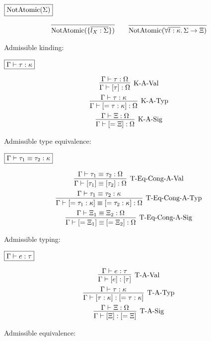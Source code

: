 $\fbox{$\mathop{\mathrm{NotAtomic}}(\Sigma)$}$

\begin{gather*}
  \infer{\symNotAtomic(\{\overline{l_X: \Sigma}\})}{}
  \hspace{2em}
  \infer{\symNotAtomic(\forall \overline{t: \kappa}\ldotp \Sigma \to \Xi)}{}
\end{gather*}

Admissible kinding:

$\fbox{$\Gamma \vdash \tau: \kappa$}$

\begin{gather*}
  \infer[\text{K-A-Val}]{\Gamma \vdash [\tau]: \Omega}{
    \Gamma \vdash \tau: \Omega
  }
  \\
  \infer[\text{K-A-Typ}]{\Gamma \vdash [= \tau: \kappa]: \Omega}{
    \Gamma \vdash \tau: \kappa
  }
  \\
  \infer[\text{K-A-Sig}]{\Gamma \vdash [= \Xi]: \Omega}{
    \Gamma \vdash \Xi: \Omega
  }
\end{gather*}

Admissible type equivalence:

$\fbox{$\Gamma \vdash \tau_1 \equiv \tau_2: \kappa$}$

\begin{gather*}
  \infer[\text{T-Eq-Cong-A-Val}]{\Gamma \vdash [\tau_1] \equiv [\tau_2]: \Omega}{
    \Gamma \vdash \tau_1 \equiv \tau_2: \Omega
  }
  \\
  \infer[\text{T-Eq-Cong-A-Typ}]{\Gamma \vdash [= \tau_1: \kappa] \equiv [= \tau_2: \kappa]: \Omega}{
    \Gamma \vdash \tau_1 \equiv \tau_2: \kappa
  }
  \\
  \infer[\text{T-Eq-Cong-A-Sig}]{\Gamma \vdash [= \Xi_1] \equiv [= \Xi_2]: \Omega}{
    \Gamma \vdash \Xi_1 \equiv \Xi_2: \Omega
  }
\end{gather*}

Admissible typing:

$\fbox{$\Gamma \vdash e: \tau$}$

\begin{gather*}
  \infer[\text{T-A-Val}]{\Gamma \vdash [e]: [\tau]}{
    \Gamma \vdash e: \tau
  }
  \\
  \infer[\text{T-A-Typ}]{\Gamma \vdash [\tau: \kappa]: [= \tau: \kappa]}{
    \Gamma \vdash \tau: \kappa
  }
  \\
  \infer[\text{T-A-Sig}]{\Gamma \vdash [\Xi]: [= \Xi]}{
    \Gamma \vdash \Xi: \Omega
  }
\end{gather*}

Admissible equivalence:


